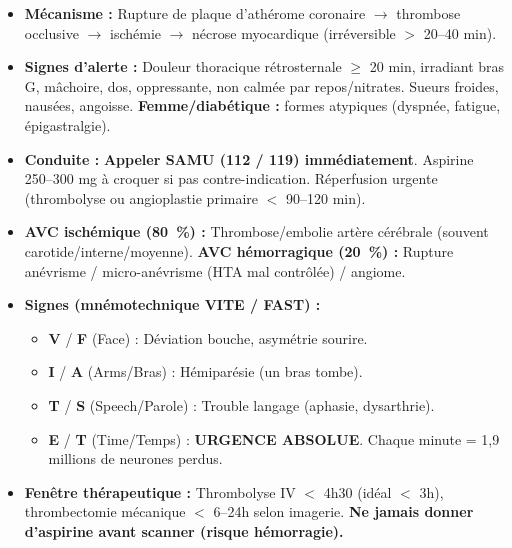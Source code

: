 \documentclass[11pt]{article}
\begin{document}
\begin{propriete}
\begin{itemize}
\item \textbf{Mécanisme :} Rupture de plaque d'athérome coronaire $\rightarrow$ thrombose occlusive $\rightarrow$ ischémie $\rightarrow$ nécrose myocardique (irréversible $>$ 20--40 min).
\item \textbf{Signes d'alerte :} Douleur thoracique rétrosternale $\ge$ 20 min, irradiant bras G, mâchoire, dos, oppressante, non calmée par repos/nitrates. Sueurs froides, nausées, angoisse. \textbf{Femme/diabétique :} formes atypiques (dyspnée, fatigue, épigastralgie).
\item \textbf{Conduite :} \textbf{Appeler SAMU (112 / 119) immédiatement}. Aspirine 250--300 mg à croquer si pas contre-indication. Réperfusion urgente (thrombolyse ou angioplastie primaire $<$ 90--120 min).
\end{itemize}
\end{propriete}

\begin{propriete}
\begin{itemize}
\item \textbf{AVC ischémique (80~\%) :} Thrombose/embolie artère cérébrale (souvent carotide/interne/moyenne). \textbf{AVC hémorragique (20~\%) :} Rupture anévrisme / micro-anévrisme (HTA mal contrôlée) / angiome.
\item \textbf{Signes (mnémotechnique \textbf{VITE} / \textbf{FAST}) :}
    \begin{itemize}
    \item \textbf{V} / \textbf{F} (Face) : Déviation bouche, asymétrie sourire.
    \item \textbf{I} / \textbf{A} (Arms/Bras) : Hémiparésie (un bras tombe).
    \item \textbf{T} / \textbf{S} (Speech/Parole) : Trouble langage (aphasie, dysarthrie).
    \item \textbf{E} / \textbf{T} (Time/Temps) : \textbf{URGENCE ABSOLUE}. Chaque minute = 1,9 millions de neurones perdus.
    \end{itemize}
\item \textbf{Fenêtre thérapeutique :} Thrombolyse IV $<$ 4h30 (idéal $<$ 3h), thrombectomie mécanique $<$ 6--24h selon imagerie. \textbf{Ne jamais donner d'aspirine avant scanner (risque hémorragie).}
\end{itemize}
\end{propriete}
\end{document}
